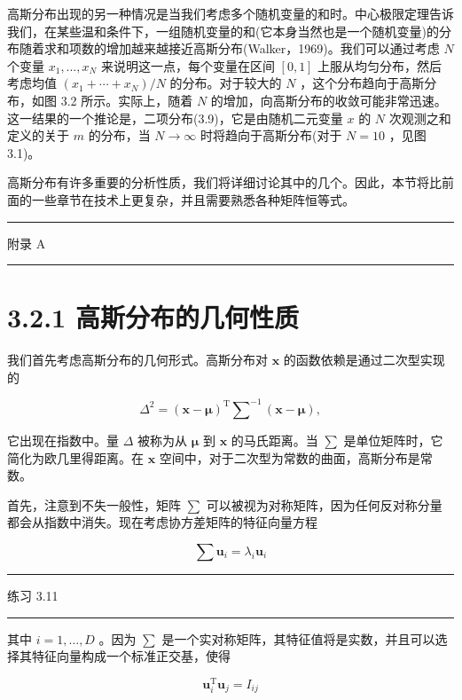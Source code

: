 \documentclass[10pt]{report}
\newcommand{\HRule}{\begin{center}\rule{0.9\linewidth}{0.2mm}\end{center}}
\begin{document}
高斯分布出现的另一种情况是当我们考虑多个随机变量的和时。中心极限定理告诉我们，在某些温和条件下，一组随机变量的和(它本身当然也是一个随机变量)的分布随着求和项数的增加越来越接近高斯分布(Walker，1969)。我们可以通过考虑 \(N\) 个变量 \({x}_{1},\ldots ,{x}_{N}\) 来说明这一点，每个变量在区间 \(\left\lbrack  {0,1}\right\rbrack\) 上服从均匀分布，然后考虑均值 \(\left( {{x}_{1} + \cdots  + {x}_{N}}\right) /N\) 的分布。对于较大的 \(N\) ，这个分布趋向于高斯分布，如图 3.2 所示。实际上，随着 \(N\) 的增加，向高斯分布的收敛可能非常迅速。这一结果的一个推论是，二项分布(3.9)，它是由随机二元变量 \(x\) 的 \(N\) 次观测之和定义的关于 \(m\) 的分布，当 \(N \rightarrow  \infty\) 时将趋向于高斯分布(对于 \(N = {10}\) ，见图 3.1)。

高斯分布有许多重要的分析性质，我们将详细讨论其中的几个。因此，本节将比前面的一些章节在技术上更复杂，并且需要熟悉各种矩阵恒等式。

\HRule

附录 A

\HRule

\section*{3.2.1 高斯分布的几何性质}

我们首先考虑高斯分布的几何形式。高斯分布对 \(\mathbf{x}\) 的函数依赖是通过二次型实现的

\[
{\Delta }^{2} = {\left( \mathbf{x} - \mathbf{\mu }\right) }^{\mathrm{T}}{\mathbf{\sum }}^{-1}\left( {\mathbf{x} - \mathbf{\mu }}\right) , \tag{3.27}
\]

它出现在指数中。量 \(\Delta\) 被称为从 \(\mathbf{\mu }\) 到 \(\mathbf{x}\) 的马氏距离。当 \(\mathbf{\sum }\) 是单位矩阵时，它简化为欧几里得距离。在 \(\mathbf{x}\) 空间中，对于二次型为常数的曲面，高斯分布是常数。

首先，注意到不失一般性，矩阵 \(\mathbf{\sum }\) 可以被视为对称矩阵，因为任何反对称分量都会从指数中消失。现在考虑协方差矩阵的特征向量方程

\[
\sum {\mathbf{u}}_{i} = {\lambda }_{i}{\mathbf{u}}_{i} \tag{3.28}
\]

\HRule

练习 3.11

\HRule

其中 \(i = 1,\ldots ,D\) 。因为 \(\mathbf{\sum }\) 是一个实对称矩阵，其特征值将是实数，并且可以选择其特征向量构成一个标准正交基，使得

\[
{\mathbf{u}}_{i}^{\mathrm{T}}{\mathbf{u}}_{j} = {I}_{ij} \tag{3.29}
\]
\end{document}
